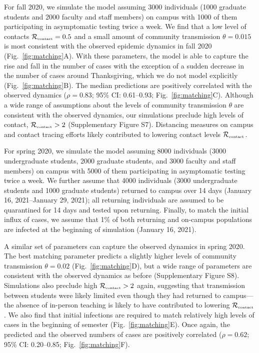 \documentclass[12pt]{article}
\newcommand{\fref}[1]{Fig.~\ref{fig:#1}}
\newcommand{\Rx}[1]{\ensuremath{{\mathcal R}_{#1}}}
\newcommand{\Rc}{\Rx{\textrm{\tiny{contact}}}}
\begin{document}
For fall 2020, we simulate the model assuming 3000 individuals (1000 graduate students and 2000 faculty and staff members) on campus with 1000 of them participating in asymptomatic testing twice a week.
We find that a low level of contacts $\Rc=0.5$ and a small amount of community transmission $\theta=0.015$ is most consistent with the observed epidemic dynamics in fall 2020 (\fref{matching}A).
With these parameters, the model is able to capture the rise and fall in the number of cases with the exception of a sudden decrease in the number of cases around Thanksgiving, which we do not model explicitly (\fref{matching}B).
The median predictions are positively correlated with the observed dynamics ($\rho = 0.83$; 95\% CI: 0.61--0.93; \fref{matching}C).
Although a wide range of assumptions about the levels of community transmission $\theta$ are consistent with the observed dynamics, our simulations preclude high levels of contact, $\Rc > 2$ (Supplementary Figure S7).
Distancing measures on campus and contact tracing efforts likely contributed to lowering contact levels $\Rc$.

For spring 2020, we simulate the model assuming 8000 individuals (3000 undergraduate students, 2000 graduate students, and 3000 faculty and staff members) on campus with 5000 of them participating in asymptomatic testing twice a week.
We further assume that 4000 individuals (3000 undergraduate students and 1000 graduate students) returned to campus over 14 days (January 16, 2021--January 29, 2021);
all returning individuals are assumed to be quarantined for 14 days and tested upon returning. 
Finally, to match the initial influx of cases, we assume that 1\% of both returning and on-campus populations are infected at the beginning of simulation (January 16, 2021).

A similar set of parameters can capture the observed dynamics in spring 2020.
The best matching parameter predicts a slightly higher levels of community transmission $\theta=0.02$ (\fref{matching}D), but a wide range of parameters are consistent with the observed dynamics as before (Supplementary Figure S8). 
Simulations also preclude high $\Rc > 2$ again, suggesting that transmission between students were likely limited even though they had returned to campus---the absence of in-person teaching is likely to have contributed to lowering $\Rc$.
We also find that initial infections are required to match relatively high levels of cases in the beginning of semester (\fref{matching}E). 
Once again, the predicted and the observed numbers of cases are positively correlated ($\rho = 0.62$; 95\% CI: 0.20--0.85; \fref{matching}F).
\end{document}
